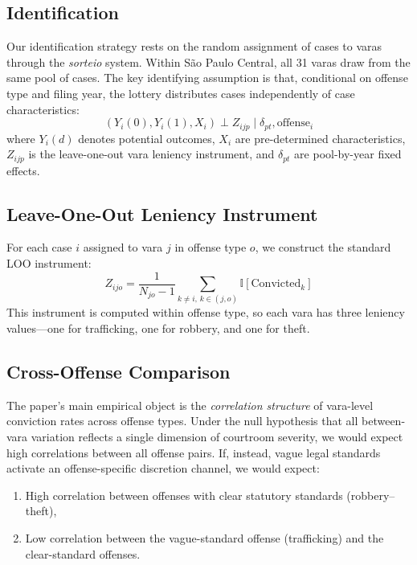 \documentclass[12pt]{article}
\newcommand{\ind}{\mathbb{I}}
\begin{document}
\subsection{Identification}

Our identification strategy rests on the random assignment of cases to varas through the \textit{sorteio} system. Within S\~ao Paulo Central, all 31 varas draw from the same pool of cases. The key identifying assumption is that, conditional on offense type and filing year, the lottery distributes cases independently of case characteristics:
\begin{equation}
(Y_i(0), Y_i(1), X_i) \perp Z_{ijp} \mid \delta_{pt}, \text{offense}_i
\label{eq:independence}
\end{equation}
where $Y_i(d)$ denotes potential outcomes, $X_i$ are pre-determined characteristics, $Z_{ijp}$ is the leave-one-out vara leniency instrument, and $\delta_{pt}$ are pool-by-year fixed effects.

\subsection{Leave-One-Out Leniency Instrument}

For each case $i$ assigned to vara $j$ in offense type $o$, we construct the standard LOO instrument:
\begin{equation}
Z_{ijo} = \frac{1}{N_{jo} - 1} \sum_{k \neq i,\, k \in (j,o)} \ind[\text{Convicted}_k]
\label{eq:leniency}
\end{equation}
This instrument is computed within offense type, so each vara has three leniency values---one for trafficking, one for robbery, and one for theft.

\subsection{Cross-Offense Comparison}

The paper's main empirical object is the \textit{correlation structure} of vara-level conviction rates across offense types. Under the null hypothesis that all between-vara variation reflects a single dimension of courtroom severity, we would expect high correlations between all offense pairs. If, instead, vague legal standards activate an offense-specific discretion channel, we would expect:
\begin{enumerate}
\item High correlation between offenses with clear statutory standards (robbery--theft),
\item Low correlation between the vague-standard offense (trafficking) and the clear-standard offenses.
\end{enumerate}
\end{document}
